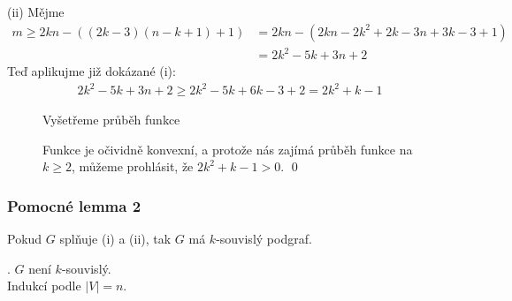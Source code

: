 (ii) Mějme
\begin{align*}
    m \geq 2kn - ((2k-3)(n-k+1)+1) &= 2kn - (2kn - 2k^2 + 2k - 3n+ 3k-3+1)\\
    &= 2k^2 - 5k + 3n + 2
\end{align*}
Teď aplikujme již dokázané (i):
\begin{align*}
    2k^2 - 5k + 3n + 2 \geq 2k^2 - 5k + 6k - 3 + 2 = 2k^2 + k - 1 
\end{align*}
\begin{figure}[H]
    \centering
    \begin{minipage}[c]{0.4\textwidth}
        Vyšetřeme průběh funkce
        \begin{figure}[H]
        \end{figure}
    \end{minipage}%
    \hspace{0.05\textwidth}
    \begin{minipage}[c]{0.5\textwidth}
        Funkce je očividně konvexní, a protože nás zajímá průběh funkce na $k \geq 2$, můžeme prohlásit, že 
        $2k^2 + k - 1 > 0$. \hspace{\fill} \qed
    \end{minipage}
\end{figure}

\subsubsection{Pomocné lemma 2}
Pokud $G$ splňuje (i) a (ii), tak $G$ má $k$-souvislý podgraf.

. $G$ není $k$-souvislý.\\
Indukcí podle $|V| = n$.

